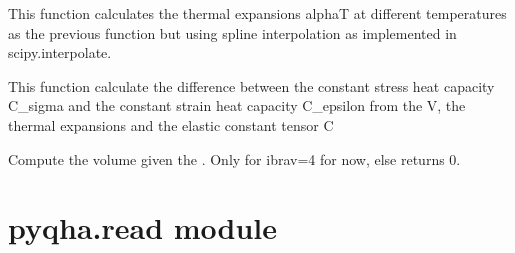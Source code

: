 \documentclass[letterpaper,10pt,english]{sphinxmanual}
\begin{document}
\begin{fulllineitems}
\label{pyqha:pyqha.properties_anis.compute_alpha_splines}
This function calculates the thermal expansions alphaT at different temperatures
as the previous function but using spline interpolation as implemented in
scipy.interpolate.

\end{fulllineitems}


\begin{fulllineitems}
\label{pyqha:pyqha.properties_anis.compute_heat_capacity}
This function calculate the difference between the constant stress heat capacity
C\_sigma and the constant strain heat capacity C\_epsilon from the V, the thermal
expansions and the elastic constant tensor C

\end{fulllineitems}


\begin{fulllineitems}
\label{pyqha:pyqha.properties_anis.compute_volume}
Compute the volume given the . Only for ibrav=4 for now, else 
returns 0.

\end{fulllineitems}



\section{pyqha.read module}
\label{pyqha:pyqha-read-module}\label{pyqha:module-pyqha.read}
\end{document}

